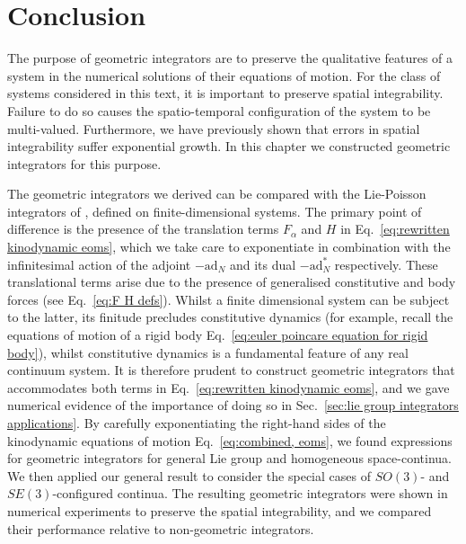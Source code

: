  
\section{Conclusion}
 
The purpose of geometric integrators are to preserve the qualitative features of a system in the numerical solutions of their equations of motion. For the class of systems considered in this text, it is important to preserve spatial integrability. Failure to do so causes the spatio-temporal configuration of the system to be multi-valued. Furthermore, we have previously shown that errors in spatial integrability suffer exponential growth. In this chapter we constructed geometric integrators for this purpose.

 The geometric integrators we derived can be compared with the Lie-Poisson integrators of \citep{munthe-kaasHighOrderRungeKutta1999, buddGeometricIntegrationNumerical1999, engoNumericalIntegrationLie2001}, defined on finite-dimensional systems. The primary point of difference is the presence of the translation terms $F_\alpha$ and $H$ in Eq.~\ref{eq:rewritten kinodynamic eoms}, which we take care to exponentiate in combination with the infinitesimal action of the adjoint $-\text{ad}_N$ and its dual $-\text{ad}^*_N$ respectively. These translational terms arise due to the presence of generalised constitutive and body forces (see Eq.~\ref{eq:F H defs}). Whilst a finite dimensional system can be subject to the latter, its finitude precludes constitutive dynamics (for example, recall the equations of motion of a rigid body Eq.~\ref{eq:euler poincare equation for rigid body}), whilst constitutive dynamics is a fundamental feature of any real continuum system. It is therefore prudent to construct geometric integrators that accommodates both terms in Eq.~\ref{eq:rewritten kinodynamic eoms}, and we gave numerical evidence of the importance of doing so in Sec.~\ref{sec:lie group integrators applications}. By carefully exponentiating the right-hand sides of the kinodynamic equations of motion Eq.~\ref{eq:combined, eoms}, we found expressions for geometric integrators for general Lie group and homogeneous space-continua. We then applied our general result to consider the special cases of $SO(3)$- and $SE(3)$-configured continua. The resulting geometric integrators were shown in numerical experiments to preserve the spatial integrability, and we compared their performance relative to non-geometric integrators.
 
